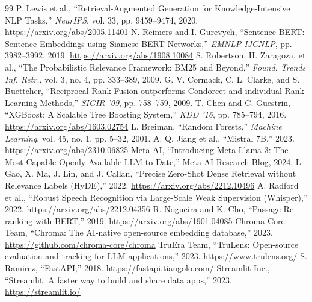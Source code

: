 \documentclass[11pt,a4paper]{report}
\begin{document}
\begin{thebibliography}{99}
 P. Lewis et al., ``Retrieval-Augmented Generation for Knowledge-Intensive NLP Tasks,'' \emph{NeurIPS}, vol. 33, pp. 9459--9474, 2020. \url{https://arxiv.org/abs/2005.11401}
 N. Reimers and I. Gurevych, ``Sentence-BERT: Sentence Embeddings using Siamese BERT-Networks,'' \emph{EMNLP-IJCNLP}, pp. 3982--3992, 2019. \url{https://arxiv.org/abs/1908.10084}
 S. Robertson, H. Zaragoza, et al., ``The Probabilistic Relevance Framework: BM25 and Beyond,'' \emph{Found. Trends Inf. Retr.}, vol. 3, no. 4, pp. 333--389, 2009.
 G. V. Cormack, C. L. Clarke, and S. Buettcher, ``Reciprocal Rank Fusion outperforms Condorcet and individual Rank Learning Methods,'' \emph{SIGIR '09}, pp. 758--759, 2009.
 T. Chen and C. Guestrin, ``XGBoost: A Scalable Tree Boosting System,'' \emph{KDD '16}, pp. 785--794, 2016. \url{https://arxiv.org/abs/1603.02754}
 L. Breiman, ``Random Forests,'' \emph{Machine Learning}, vol. 45, no. 1, pp. 5--32, 2001.
 A. Q. Jiang et al., ``Mistral 7B,'' 2023. \url{https://arxiv.org/abs/2310.06825}
 Meta AI, ``Introducing Meta Llama 3: The Most Capable Openly Available LLM to Date,'' Meta AI Research Blog, 2024.
 L. Gao, X. Ma, J. Lin, and J. Callan, ``Precise Zero-Shot Dense Retrieval without Relevance Labels (HyDE),'' 2022. \url{https://arxiv.org/abs/2212.10496}
 A. Radford et al., ``Robust Speech Recognition via Large-Scale Weak Supervision (Whisper),'' 2022. \url{https://arxiv.org/abs/2212.04356}
 R. Nogueira and K. Cho, ``Passage Re-ranking with BERT,'' 2019. \url{https://arxiv.org/abs/1901.04085}
 Chroma Core Team, ``Chroma: The AI-native open-source embedding database,'' 2023. \url{https://github.com/chroma-core/chroma}
 TruEra Team, ``TruLens: Open-source evaluation and tracking for LLM applications,'' 2023. \url{https://www.trulens.org/}
 S. Ramirez, ``FastAPI,'' 2018. \url{https://fastapi.tiangolo.com/}
 Streamlit Inc., ``Streamlit: A faster way to build and share data apps,'' 2023. \url{https://streamlit.io/}
\end{thebibliography}
\end{document}
